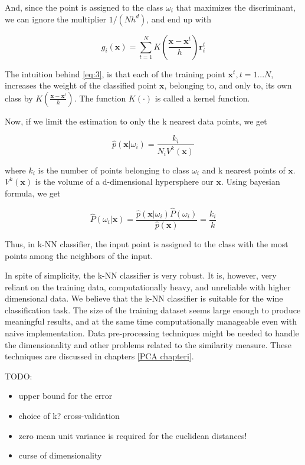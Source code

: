 And, since the point is assigned to the class $\omega_{i}$ that maximizes the discriminant, we can ignore the multiplier $1/(Nh^{d})$, and end up with

\begin{equation}
  \label{eq:3}
  g_{i}(\mathbf{x}) = \sum_{t=1}^{N}K(\frac{\mathbf{x} - \mathbf{x}^{t}}{h})\mathbf{r}_{i}^{t}
\end{equation}

The intuition behind \eqref{eq:3}, is that each of the training point $\mathbf{x}^t, t = 1...N$, increases the weight of the classified point $\mathbf{x}$, belonging to, and only to, its own class by $K(\frac{\mathbf{x} - \mathbf{x}^{t}}{h})$. The function $K(\cdot)$ is called a kernel function.

Now, if we limit the estimation to only the k nearest data points, we get

\begin{equation*}
  \label{eq:4}
  \hat{p}(\mathbf{x} | \omega_{i}) = \frac{k_{i}}{N_{i}V^{k}(\mathbf{x})}
\end{equation*}

where $k_{i}$ is the number of points belonging to class $\omega_{i}$ and k nearest points of $\mathbf{x}$. $V^{k}(\mathbf{x})$ is the volume of a d-dimensional hypersphere our $\mathbf{x}$. Using bayesian formula, we get

\begin{equation*}
  \label{eq:5}
  \hat{P}(\omega_{i}|\mathbf{x}) = \frac{\hat{p}(\mathbf{x}|\omega_{i})\hat{P}(\omega_{i})}{\hat{p}(\mathbf{x})} = \frac{k_i}{k}
\end{equation*}

Thus, in k-NN classifier, the input point is assigned to the class with the most points among the neighbors of the input.

In spite of simplicity, the k-NN classifier is very robust. It is, however, very reliant on the
training data, computationally heavy, and unreliable with higher dimensional data. We believe that the k-NN classifier is suitable for the wine classification task. The size of the training dataset seems large enough to produce meaningful results, and at the same time computationally manageable even with naive implementation. Data pre-processing techniques might be needed to handle the dimensionality and other problems related to the similarity measure. These techniques are discussed in chapters \ref{PCA chapteri}.

TODO:
\begin{itemize}
\item upper bound for the error
\item choice of k? cross-validation
\item zero mean unit variance is required for the euclidean distances!
\item curse of dimensionality
\end{itemize}


